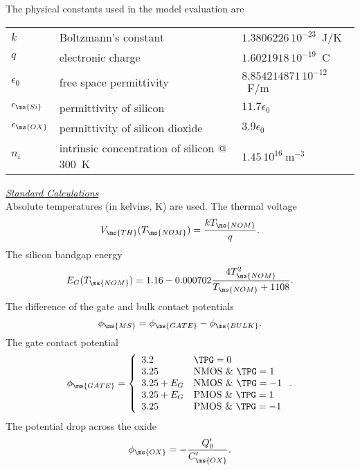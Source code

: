 The physical constants used in the model evaluation are
\begin{center}
\begin{tabular}{|l|l|l|}
\hline
$k$ & Boltzmann's constant           &  $1.3806226\,10^{-23}$~J/K\\
$q$ & electronic charge             & $1.6021918\,10^{-19}$~C\\
$\epsilon_0$& free space permittivity &  $8.854214871\,10^{-12}$~F/m\\
$\epsilon_{\ms{Si}}$& permittivity of silicon &  $11.7 \epsilon_0$\\
$\epsilon_{\ms{OX}}$& permittivity of silicon dioxide &  $3.9 \epsilon_0$\\
$n_i$&intrinsic concentration of silicon @ 300~K& $1.45\,10^{16}~\mbox{m}^{-3}$\\
\hline
\end{tabular}
\end{center}
\vfill
\noindent\underline{\sl \large Standard Calculations}\\[0.1in]
Absolute temperatures (in kelvins, K) are used. The thermal
voltage
\begin{equation}
V_{\ms{TH}}(T_{\ms{NOM}}) = {{kT_{\ms{NOM}}} \over q} .
\end{equation}
\noindent The silicon bandgap energy
\begin{equation}
E_G(T_{\ms{NOM}})=1.16 - 0.000702{{4T_{\ms{NOM}}^2} \over
{T_{\ms{NOM}}+1108}} .
\end{equation}
The difference of the gate and bulk contact potentials
\begin{equation}
\phi_{\ms{MS}} = \phi_{\ms{GATE}} - \phi_{\ms{BULK}} .
\end{equation}
The gate contact potential
\begin{equation}
\phi_{\ms{GATE}} = \left\{ \begin{array}{ll}
        3.2 & \mbox{$\TPG = 0$}\\
        3.25& \mbox{NMOS \& $\TPG = 1$}\\
        3.25 + E_G     & \mbox{NMOS \& $\TPG = -1$}\\
        3.25 + E_G     & \mbox{PMOS \& $\TPG = 1$} \\
        3.25& \mbox{PMOS \& $\TPG = -1$}
        \end{array} \right. .
\end{equation}
The potential drop across the oxide
\begin{equation}
\phi_{\ms{OX}} = - {{\textstyle Q'_0 } \over { C'_{\ms{OX}}}} .
\end{equation}

